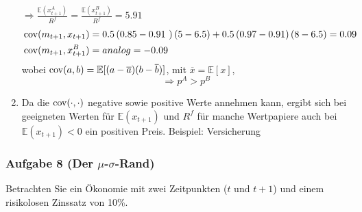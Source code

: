 \documentclass[12pt]{extreport} %
\theoremstyle{named}
\theoremstyle{nnamed}
\theoremstyle{itshape}
\theoremstyle{normal}
\begin{document}
\begin{enumerate}
		$\Rightarrow \frac{\mathbb{E}(x_{t+1}^A)}{R^f} = \frac{\mathbb{E}(x_{t+1}^B)}{R^f} = 5.91$
		\begin{align*}
			& \cov(m_{t+1}, x_{t+1}) = 0.5 \left( 0.85 - 0.91 \right) \left( 5 - 6.5 \right) + 0.5 \left(0.97 - 0.91 \right) \left( 8 - 6.5 \right) = 0.09 \\
			& \cov(m_{t+1}, x_{t+1}^B) = analog = -0.09 
		\end{align*}
		wobei $\operatorname{cov}(a, b) = \mathbb{E}[(a - \overline{a})(b - \overline{b})]$, mit $\overline{x} = \mathbb{E}[x]$, 
	$$\Rightarrow p^A > p^B$$
	\item Da die $\operatorname{cov}(\cdot, \cdot)$ negative sowie positive Werte annehmen kann, ergibt sich bei geeigneten Werten für $\mathbb{E}(x_{t+1})$ und $R^f$ für manche Wertpapiere auch bei $\mathbb{E}(x_{t+1}) < 0$ ein positiven Preis. Beispiel: Versicherung
\end{enumerate}

\newpage

\subsubsection*{Aufgabe 8 (Der $\mu$-$\sigma$-Rand)}

Betrachten Sie ein Ökonomie mit zwei Zeitpunkten ($t$ und $t+1$) und einem risikolosen Zinssatz von 10\%.
\end{document}
